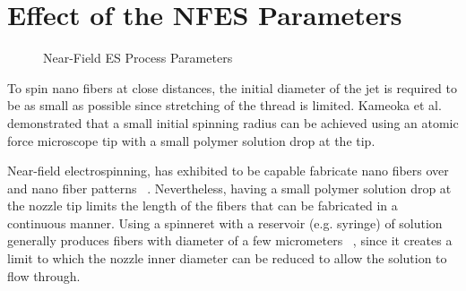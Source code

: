 \documentclass[5p,,preprint,12pt,twocolumn]{elsarticle}
\makeatletter
\def\fixFloatSize#1{}%
\makeatother
\begin{document}
\section{Effect of the NFES Parameters}

\bgroup
\fixFloatSize{images/d29b646e-eca6-4b31-ab15-4cfc6fc94809-udrf_electrospinningvariants.jpg}
\begin{figure}[!htbp]
\centering \makeatletter{}
\makeatother 
\caption{{Near-Field ES Process Parameters}}
\label{f-3629d3a3f9cf}
\end{figure}
\egroup
To spin nano fibers at close distances, the initial diameter of the jet is required to be as small as possible since stretching of the thread is limited. Kameoka et al.\unskip~\cite{527120:12321556} demonstrated that a small initial spinning radius can be achieved using an atomic force microscope tip with a small polymer solution drop at the tip.

Near-field electrospinning, has exhibited to be capable fabricate nano fibers over and nano fiber patterns \unskip~\cite{527120:11974321}. Nevertheless, having a small polymer solution drop at the nozzle tip limits the length of the fibers that can be fabricated in a continuous manner. Using a spinneret with a reservoir (e.g. syringe) of solution generally produces fibers with diameter of a few micrometers \unskip~\cite{527120:11974310,527120:11974326}, since it creates a limit to which the nozzle inner diameter can be reduced to allow the solution to flow through.
\end{document}
